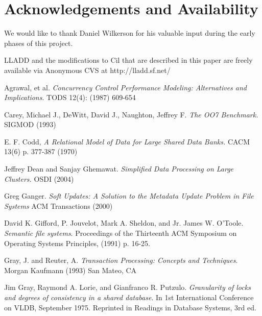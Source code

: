 \documentclass[10pt,letterpaper,twocolumn,english]{article}
\newcommand{\yad}{LLADD\xspace}
\begin{document}
\section{Acknowledgements and Availability}

We would like to thank Daniel Wilkerson for his valuable input during
the early phases of this project.

\yad and the modifications to Cil that are described in this paper are
freely available via Anonymous CVS at http://lladd.sf.net/


\begin{thebibliography}{99}
\begin{small}
 Agrawal, et al. {\em Concurrency
Control Performance Modeling: Alternatives and Implications}. TODS
12(4): (1987) 609-654



 Carey, Michael J., DeWitt, David J., Naughton, Jeffrey F. {\em The OO7 Benchmark.} SIGMOD (1993)

 E. F. Codd, {\em A Relational Model of Data for Large Shared Data Banks.} CACM 13(6) p. 377-387 (1970)

 Jeffrey Dean and Sanjay Ghemawat. {\em Simplified Data Processing on Large Clusters. } OSDI (2004)


 Greg Ganger.  {\em Soft Updates: A Solution to the Metadata Update Problem in File Systems } ACM Transactions (2000)

 David K. Gifford, P. Jouvelot, Mark A. Sheldon, and Jr. James W. O'Toole. {\em Semantic file systems}. Proceedings of the Thirteenth ACM Symposium on Operating Systems Principles, (1991) p. 16-25.

 Gray, J. and Reuter, A. {\em Transaction Processing: Concepts and Techniques}. Morgan Kaufmann (1993) San Mateo, CA

 Jim Gray, Raymond A. Lorie, and Gianfranco R. Putzulo. {\em Granularity of locks and degrees of consistency in a shared database}. In 1st International Conference on VLDB, September 1975. Reprinted in Readings in Database Systems, 3rd ed.


\end{small}
\end{thebibliography}
\end{document}
